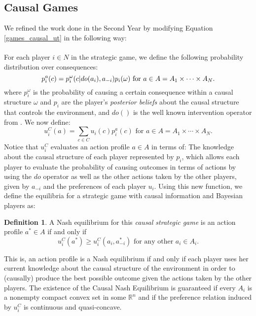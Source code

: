 \documentclass[english,letterpaper,12pt,final]{article}
\theoremstyle{definition}
\newtheorem{defi}{Definition}[section]
\begin{document}
\subsection{Causal Games}
We refined the work done in the Second Year by modifying Equation \ref{games_causal_ut} in the following way:\\
\\
For each player $i \in N$ in the strategic game, we define the following probability distribution over consequences:
\begin{equation}{\label{causal_utility}}
p^a_i (c) =  p^\omega_i (c | do(a_i), a_{-i}) p_i(\omega)\textrm{ for } a \in A=A_1 \times \cdots \times A_N.
\end{equation}
where $p^\omega_i$ is the probability of causing a certain consequence within a causal structure $\omega$ and $p_i$ are the player's \textit{posterior beliefs} about the causal structure that controls the environment, and $do()$ is the well known intervention operator from \cite{pearl2009causality}. We now define:
\begin{equation}
u^C_i (a) = \sum_{c \in C}  u_i(c) p^a_i (c) \textrm{ for } a \in A=A_1 \times \cdots \times A_N.
\end{equation}
Notice that $u^C_i$ evaluates an action profile $a \in A$ in terms of: The knowledge about the causal structure of each player represented by $p_i$, which allows each player to evaluate the probability of causing outcomes in terms of actions by using the $do$ operator as well as the other actions taken by the other players, given by $a_{-i}$ and the preferences of each player $u_i$. Using this new function, we define the equilibria for a strategic game with causal information and Bayesian players as:
\begin{defi}
A Nash equilibrium for this \textit{causal strategic game} is an action profile $a^\ast \in A$ if and only if
\begin{equation}
 u^C_i(a^\ast) \geq u^C_i(a_i, a^\ast_{-i}) \textrm{ for any other } a_i \in A_i. 
 \end{equation}
\end{defi}
This is, an action profile is a Nash equilibrium if and only if each player uses her current knowledge about the causal structure of the environment in order to (causally) produce the best possible outcome given the actions taken by the other players. The existence of the Causal Nash Equilibrium is guaranteed if every $A_i$ is a nonempty compact convex set in some $\mathbb{R}^n$ and if the preference relation induced by $u^C_i$ is continuous and quasi-concave.
\end{document}
